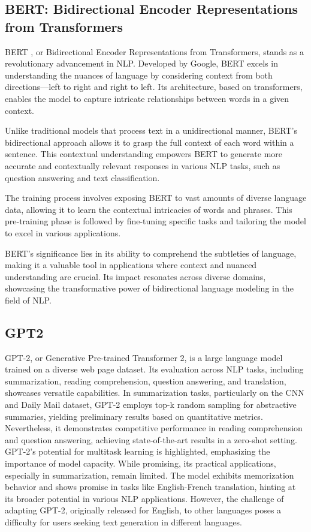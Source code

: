\subsection{BERT: Bidirectional Encoder Representations from Transformers}

BERT \cite{devlin2019bert}, or Bidirectional Encoder Representations from Transformers, stands as a revolutionary advancement in NLP. Developed by Google, BERT excels in understanding the nuances of language by considering context from both directions—left to right and right to left. Its architecture, based on transformers, enables the model to capture intricate relationships between words in a given context.

Unlike traditional models that process text in a unidirectional manner, BERT's bidirectional approach allows it to grasp the full context of each word within a sentence. This contextual understanding empowers BERT to generate more accurate and contextually relevant responses in various NLP tasks, such as question answering and text classification.

The training process involves exposing BERT to vast amounts of diverse language data, allowing it to learn the contextual intricacies of words and phrases. This pre-training phase is followed by fine-tuning specific tasks and tailoring the model to excel in various applications.

BERT's significance lies in its ability to comprehend the subtleties of language, making it a valuable tool in applications where context and nuanced understanding are crucial. Its impact resonates across diverse domains, showcasing the transformative power of bidirectional language modeling in the field of NLP.

\subsection{GPT2}\label{gpt2}

GPT-2, or Generative Pre-trained Transformer 2, is a large language model trained on a diverse web page dataset. Its evaluation across NLP tasks, including summarization, reading comprehension, question answering, and translation, showcases versatile capabilities. In summarization tasks, particularly on the CNN and Daily Mail dataset, GPT-2 employs top-k random sampling for abstractive summaries, yielding preliminary results based on quantitative metrics. Nevertheless, it demonstrates competitive performance in reading comprehension and question answering, achieving state-of-the-art results in a zero-shot setting. GPT-2's potential for multitask learning is highlighted, emphasizing the importance of model capacity. While promising, its practical applications, especially in summarization, remain limited. The model exhibits memorization behavior and shows promise in tasks like English-French translation, hinting at its broader potential in various NLP applications. However, the challenge of adapting GPT-2, originally released for English, to other languages poses a difficulty for users seeking text generation in different languages.\cite{radford2019language}

